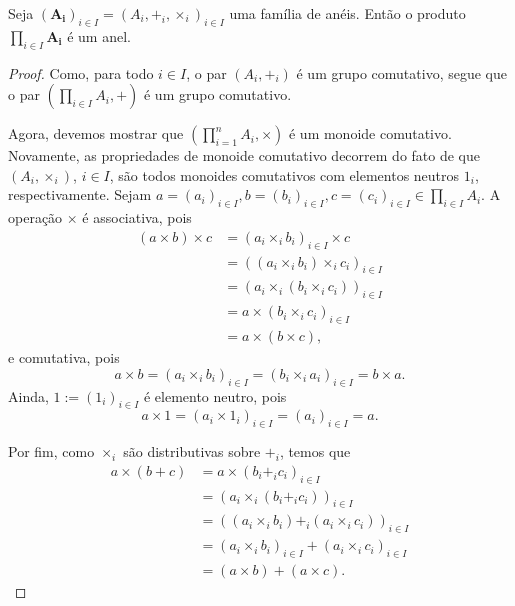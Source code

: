 \begin{proposition}
Seja $(\bm{A_i})_{i \in I}=(A_i,+_i,\times_i)_{i \in I}$ uma família de anéis. Então o produto $\prod_{i \in I}\bm{A_i}$ é um anel.
\end{proposition}
\begin{proof}
Como,  para todo $i \in I$, o par $(A_i,+_i)$ é um grupo comutativo, segue que o par $\left(\prod_{i \in I} A_i,+ \right)$ é um grupo comutativo.

Agora, devemos mostrar que $\left( \prod_{i=1}^n A_i,\times \right)$ é um monoide comutativo. Novamente, as propriedades de monoide comutativo decorrem do fato de que $(A_i,\times_i)$, $i \in I$, são todos monoides comutativos com elementos neutros $1_i$, respectivamente. Sejam $a=(a_i)_{i \in I}, b=(b_i)_{i \in I}, c=(c_i)_{i \in I} \in \prod_{i \in I} A_i$. A operação $\times$ é associativa, pois
	\begin{align*}
	(a \times b) \times c &= (a_i \times_i b_i)_{i \in I} \times c \\
		&= ((a_i \times_i b_i) \times_i c_i)_{i \in I} \\
		&= (a_i \times_i (b_i \times_i c_i))_{i \in I} \\
		&= a \times (b_i \times_i c_i)_{i \in I} \\
		&= a \times (b \times c),
	\end{align*}
e comutativa, pois
	\begin{equation*}
	a \times b = (a_i \times_i b_i)_{i \in I} = (b_i \times_i a_i)_{i \in I} = b \times a.
	\end{equation*}
Ainda, $1 := (1_i)_{i \in I}$ é elemento neutro, pois
	\begin{equation*}
	a \times 1 = (a_i \times 1_i)_{i \in I} = (a_i)_{i \in I} = a.
	\end{equation*}

	Por fim, como $\times_i$ são distributivas sobre $+_i$, temos que
	\begin{align*}
	a \times (b + c) &= a \times (b_i +_i c_i)_{i \in I} \\
		&= (a_i \times_i (b_i +_i c_i))_{i \in I} \\
		&= ((a_i \times_i b_i) +_i (a_i \times_i c_i))_{i \in I} \\
		&= (a_i \times_i b_i)_{i \in I} + (a_i \times_i c_i)_{i \in I} \\
		&= (a \times b) + (a \times c).
	\end{align*}
\end{proof}



